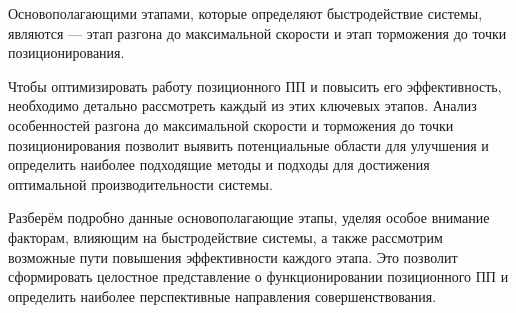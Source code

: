 Основополагающими этапами, которые определяют быстродействие системы, являются --- этап разгона
до максимальной скорости и этап торможения до точки позиционирования.

Чтобы оптимизировать работу позиционного ПП и повысить его эффективность,
необходимо детально рассмотреть каждый из этих ключевых этапов.
Анализ особенностей разгона до максимальной скорости и торможения
до точки позиционирования позволит выявить потенциальные области для
улучшения и определить наиболее подходящие методы и подходы для достижения
оптимальной производительности системы.

Разберём подробно данные основополагающие этапы,
уделяя особое внимание факторам, влияющим на быстродействие системы,
а также рассмотрим возможные пути повышения эффективности каждого этапа.
Это позволит сформировать целостное представление о функционировании позиционного ПП и
определить наиболее перспективные направления совершенствования.
